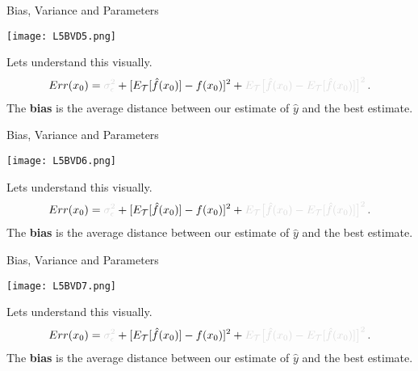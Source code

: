 \documentclass[10pt, table, dvipsnames,handout]{beamer}
\newcommand{\cT}{\ensuremath{\mathcal{T}}}
\begin{document}
\begin{frame}[fragile]{Bias, Variance and Parameters}
  \begin{minipage}[t][0.6\textheight][t]{\textwidth}
	  \centering \texttt{[image: L5BVD5.png]}
  \end{minipage}
  \vfill
  \begin{minipage}[t][0.4\textheight][t]{\textwidth}
Lets understand this visually.
$$
Err(x_0) = {\color{gray!30}\sigma_\epsilon^2} + [E_\cT[\hat f(x_0)] - f(x_0)]^2 + {\color{gray!30}E_\cT\big[ \hat{f}(x_0) - E_\cT[\hat{f}(x_0)] \big]^2}\,.
$$
The \textbf{bias} is the average distance between our estimate of $\hat{y}$ and the best estimate. 
\end{minipage}
\end{frame}


\begin{frame}[fragile]{Bias, Variance and Parameters}
  \begin{minipage}[t][0.6\textheight][t]{\textwidth}
	  \centering \texttt{[image: L5BVD6.png]}
  \end{minipage}
  \vfill
  \begin{minipage}[t][0.4\textheight][t]{\textwidth}
Lets understand this visually.
$$
Err(x_0) = {\color{gray!30}\sigma_\epsilon^2} + [E_\cT[\hat f(x_0)] - f(x_0)]^2 + {\color{gray!30}E_\cT\big[ \hat{f}(x_0) - E_\cT[\hat{f}(x_0)] \big]^2}\,.
$$
The \textbf{bias} is the average distance between our estimate of $\hat{y}$ and the best estimate. 
\end{minipage}
\end{frame}



\begin{frame}[fragile]{Bias, Variance and Parameters}
  \begin{minipage}[t][0.6\textheight][t]{\textwidth}
	  \centering \texttt{[image: L5BVD7.png]}
  \end{minipage}
  \vfill
  \begin{minipage}[t][0.4\textheight][t]{\textwidth}
Lets understand this visually.
$$
Err(x_0) = {\color{gray!30}\sigma_\epsilon^2} + [E_\cT[\hat f(x_0)] - f(x_0)]^2 + {\color{gray!30}E_\cT\big[ \hat{f}(x_0) - E_\cT[\hat{f}(x_0)] \big]^2}\,.
$$
The \textbf{bias} is the average distance between our estimate of $\hat{y}$ and the best estimate. 
\end{minipage}
\end{frame}
\end{document}
